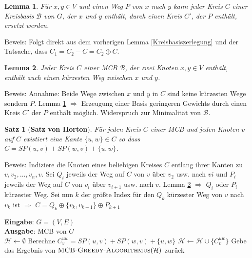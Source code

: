 \documentclass[a4paper,10pt]{scrartcl}
\newcommand{\tbf}{\textbf}
\newcommand{\tsc}{\textsc}
\newcommand{\Ra}{\Rightarrow}
\newcommand{\agn}{\leftarrow}
\newcommand{\Gr}{$G = (V,E)$ }
\newcommand{\calB}{\mathcal{B}}
\newcommand{\calH}{\mathcal{H}}
\newcommand{\Eingabe}[1]{\STATE \tbf{Eingabe}: #1 \\}
\newcommand{\Ausgabe}[1]{\STATE \tbf{Ausgabe}: #1 \\}
\newtheorem{satz}{Satz}
\newtheorem{lemma}{Lemma}
\begin{document}
\begin{lemma}\label{Kreisbasiswegersetzung}
 Für $x,y \in V$ und einen Weg $P$ von $x$ nach $y$ kann jeder Kreis $C$ einer Kreisbasis $\calB$ von $G$, der $x$ und $y$ enthält, durch einen Kreis $C'$, der $P$ enthält, ersetzt werden.
\end{lemma}

Beweis: Folgt direkt aus dem vorherigen Lemma \ref{Kreisbasiszerlegung} und der Tatsache, dass $C_1 = C_2 - C = C_2 \oplus C$.

\begin{lemma}\label{KreisbasisSP}
  Jeder Kreis $C$ einer MCB $\calB$, der zwei Knoten $x,y \in V$ enthält, enthält auch einen kürzesten Weg zwischen $x$ und $y$.
\end{lemma}

Beweis: Annahme: Beide Wege zwischen $x$ und $y$ in $C$ sind keine kürzesten Wege sondern $P$. Lemma \ref{Kreisbasiswegersetzung} $\Ra$ Erzeugung einer Basis geringeren Gewichts durch einen Kreis $C'$ der $P$ enthält möglich. Widerspruch zur Minimalität von $\calB$.

\begin{satz}[\tbf{Satz von \textsf{Horton}}]
 Für jeden Kreis $C$ einer MCB und jeden Knoten $v$ auf $C$ existiert eine Kante $\{u,w\} \in C$ so dass $C = SP(u,v) + SP(w,v) + \{u,w\}$.
\end{satz}

Beweis: Indiziere die Knoten eines beliebigen Kreises $C$ entlang ihrer Kanten zu $v, v_2, \ldots, v_n, v$. Sei $Q_i$ jeweils der Weg auf $C$ von $v$ über $v_2$ usw. nach $vi$ und $P_i$ jeweils der Weg auf $C$ von $v_i$ über $v_{i+1}$ usw. nach $v$. Lemma \ref{KreisbasisSP} $\Ra$ $Q_i$ oder $P_i$ kürzester Weg. Sei nun $k$ der größte Index für den $Q_k$ kürzester Weg von $v$ nach $v_k$ ist $\Ra$ $C = Q_k \oplus \{v_k, v_{k+1}\} \oplus P_{k+1}$ \\

\begin{algorithm}
\caption{Algorithmus von \textsf{Horton} $\in O(|V||E|^3)$}
\begin{algorithmic}
\Eingabe{\Gr}
\Ausgabe{MCB von $G$}
\STATE $\calH \agn \emptyset$
	\STATE Berechne $C_v^{uw} = SP(u,v) + SP(w,v) + \{u,w\}$
		\STATE $\calH \agn \calH \cup \{C_v^{uw}\}$
	\ENDIF
\ENDFOR
\STATE Gebe das Ergebnis von $\tsc{MCB-Greedy-Algorithmus}(\calH)$ zurück
\end{algorithmic}
\end{algorithm}
\end{document}
